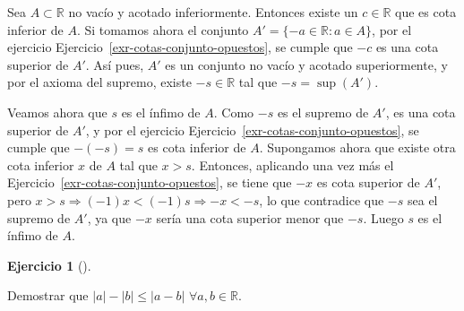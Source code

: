 \documentclass[
  a4paper,
]{scrreport}
\theoremstyle{definition}
\newtheorem{exercise}{Ejercicio}[chapter]
\theoremstyle{remark}
\begin{document}
\begin{tcolorbox}[enhanced jigsaw, left=2mm, arc=.35mm, coltitle=black, toprule=.15mm, colback=white, breakable, bottomrule=.15mm, colbacktitle=quarto-callout-tip-color!10!white, bottomtitle=1mm, toptitle=1mm, opacityback=0, titlerule=0mm, opacitybacktitle=0.6, title=\textcolor{quarto-callout-tip-color}{\faLightbulb}\hspace{0.5em}{Solución}, rightrule=.15mm, leftrule=.75mm, colframe=quarto-callout-tip-color-frame]

Sea \(A\subset\mathbb{R}\) no vacío y acotado inferiormente. Entonces
existe un \(c\in\mathbb{R}\) que es cota inferior de \(A\). Si tomamos
ahora el conjunto \(A'=\{-a\in\mathbb{R}: a\in A\}\), por el ejercicio
Ejercicio~\ref{exr-cotas-conjunto-opuestos}, se cumple que \(-c\) es una
cota superior de \(A'\). Así pues, \(A'\) es un conjunto no vacío y
acotado superiormente, y por el axioma del supremo, existe
\(-s\in\mathbb{R}\) tal que \(-s=\sup(A')\).

Veamos ahora que \(s\) es el ínfimo de \(A\). Como \(-s\) es el supremo
de \(A'\), es una cota superior de \(A'\), y por el ejercicio
Ejercicio~\ref{exr-cotas-conjunto-opuestos}, se cumple que \(-(-s)=s\)
es cota inferior de \(A\). Supongamos ahora que existe otra cota
inferior \(x\) de \(A\) tal que \(x>s\). Entonces, aplicando una vez más
el Ejercicio~\ref{exr-cotas-conjunto-opuestos}, se tiene que \(-x\) es
cota superior de \(A'\), pero
\(x>s\Rightarrow (-1)x<(-1)s \Rightarrow -x<-s\), lo que contradice que
\(-s\) sea el supremo de \(A'\), ya que \(-x\) sería una cota superior
menor que \(-s\). Luego \(s\) es el ínfimo de \(A\).

\end{tcolorbox}

\leavevmode{}%
\begin{exercise}[]\label{exr-propiedad-valor-absoluto}

Demostrar que \(|a|-|b|\leq |a-b|\) \(\forall a,b\in\mathbb{R}\).

\end{exercise}
\end{document}
